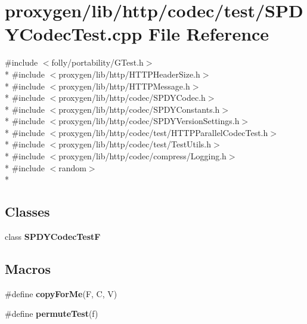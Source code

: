 \section{proxygen/lib/http/codec/test/\+S\+P\+D\+Y\+Codec\+Test.cpp File Reference}
\label{SPDYCodecTest_8cpp}
{\ttfamily \#include $<$folly/portability/\+G\+Test.\+h$>$}\\*
{\ttfamily \#include $<$proxygen/lib/http/\+H\+T\+T\+P\+Header\+Size.\+h$>$}\\*
{\ttfamily \#include $<$proxygen/lib/http/\+H\+T\+T\+P\+Message.\+h$>$}\\*
{\ttfamily \#include $<$proxygen/lib/http/codec/\+S\+P\+D\+Y\+Codec.\+h$>$}\\*
{\ttfamily \#include $<$proxygen/lib/http/codec/\+S\+P\+D\+Y\+Constants.\+h$>$}\\*
{\ttfamily \#include $<$proxygen/lib/http/codec/\+S\+P\+D\+Y\+Version\+Settings.\+h$>$}\\*
{\ttfamily \#include $<$proxygen/lib/http/codec/test/\+H\+T\+T\+P\+Parallel\+Codec\+Test.\+h$>$}\\*
{\ttfamily \#include $<$proxygen/lib/http/codec/test/\+Test\+Utils.\+h$>$}\\*
{\ttfamily \#include $<$proxygen/lib/http/codec/compress/\+Logging.\+h$>$}\\*
{\ttfamily \#include $<$random$>$}\\*
\subsection*{Classes}
\begin{DoxyCompactItemize}
\item 
class {\bf S\+P\+D\+Y\+Codec\+TestF}
\end{DoxyCompactItemize}
\subsection*{Macros}
\begin{DoxyCompactItemize}
\item 
\#define {\bf copy\+For\+Me}(F,  C,  V)
\item 
\#define {\bf permute\+Test}(f)
\end{DoxyCompactItemize}
